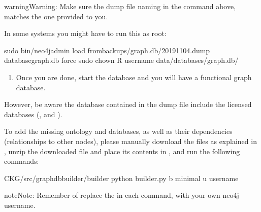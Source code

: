 \documentclass[letterpaper,10pt,english]{sphinxmanual}
\begin{document}
\begin{sphinxadmonition}{warning}{Warning:}
Make sure the dump file naming in the command above, matches the one provided to you.
\end{sphinxadmonition}

In some systems you might have to run this as root:

\begin{sphinxVerbatim}[commandchars=\\\{\}]
\PYGZdl{} sudo bin/neo4j\PYGZhy{}admin load \PYGZhy{}\PYGZhy{}frombackups/graph.db/2019\PYGZhy{}11\PYGZhy{}04.dump \PYGZhy{}\PYGZhy{}databasegraph.db \PYGZhy{}\PYGZhy{}force
\PYGZdl{} sudo chown \PYGZhy{}R username data/databases/graph.db/
\end{sphinxVerbatim}
\begin{enumerate}
%
\setcounter{enumi}{2}
\item {} 
Once you are done, start the database and you will have a functional graph database.

\end{enumerate}

However, be aware the database contained in the dump file  include the licensed databases (,  and ).

To add the missing ontology and databases, as well as their dependencies (relationships to other nodes), please manually download the files as explained in {\hyperref[\detokenize{intro/getting-started-with-build:build-neo4j-graph-database}]{}}, unzip the downloaded file  and place its contents in , and run the following commands:

\begin{sphinxVerbatim}[commandchars=\\\{\}]
\PYGZdl{}  CKG/src/graphdb\PYGZus{}builder/builder
\PYGZdl{} python builder.py \PYGZhy{}b minimal \PYGZhy{}u username
\end{sphinxVerbatim}

\begin{sphinxadmonition}{note}{Note:}
Remember of replace the  in each command, with your own neo4j username.
\end{sphinxadmonition}
\end{document}
